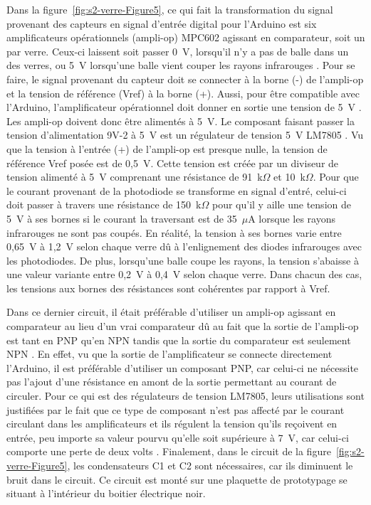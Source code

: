 Dans la figure~\ref{fig:s2-verre-Figure5}, ce qui fait la transformation du signal provenant des capteurs en signal d’entrée digital pour l’Arduino est six amplificateurs opérationnels (ampli-op) MPC602 agissant en comparateur, soit un par verre.
Ceux-ci laissent soit passer 0~V, lorsqu’il n’y a pas de balle dans un des verres, ou 5~V lorsqu’une balle vient couper les rayons infrarouges \cite{microchip_mcp6021/1r/2/3/4_2001}.
Pour se faire, le signal provenant du capteur doit se connecter à la borne (-) de l’ampli-op et la tension de référence (Vref) à la borne (+).
Aussi, pour être compatible avec l’Arduino, l’amplificateur opérationnel doit donner en sortie une tension de 5~V \cite{robotshop_arduino_2010}.
Les ampli-op doivent donc être alimentés à 5~V.
Le composant faisant passer la tension d’alimentation 9V-2 à 5~V est un régulateur de tension 5~V LM7805 \cite{fairchild_lm78xx_2006}.
Vu que la tension à l’entrée (+) de l’ampli-op est presque nulle, la tension de référence Vref posée est de 0,5~V.
Cette tension est créée par un diviseur de tension alimenté à 5~V comprenant une résistance de 91~k$\Omega$ et 10~k$\Omega$.
Pour que le courant provenant de la photodiode se transforme en signal d'entré, celui-ci doit passer à travers une résistance de 150~k$\Omega$ pour qu’il y aille une tension de 5~V à ses bornes si le courant la traversant est de 35~$\mu$A lorsque les rayons infrarouges ne sont pas coupés.
En réalité, la tension à ses bornes varie entre 0,65~V à 1,2~V selon chaque verre dû à l’enlignement des diodes infrarouges avec les photodiodes.
De plus, lorsqu’une balle coupe les rayons, la tension s’abaisse à une valeur variante entre 0,2~V à 0,4~V selon chaque verre.
Dans chacun des cas, les tensions aux bornes des résistances sont cohérentes par rapport à Vref.

Dans ce dernier circuit, il était préférable d’utiliser un ampli-op agissant en comparateur au lieu d’un vrai comparateur dû au fait que la sortie de l’ampli-op est tant en PNP qu'en NPN tandis que la sortie du comparateur est seulement NPN \cite{microchip_mcp6021/1r/2/3/4_2001}.
En effet, vu que la sortie de l’amplificateur se connecte directement l’Arduino, il est préférable d’utiliser un composant PNP, car celui-ci ne nécessite pas l’ajout d’une résistance en amont de la sortie permettant au courant de circuler.
Pour ce qui est des régulateurs de tension LM7805, leurs utilisations sont justifiées par le fait que ce type de composant n’est pas affecté par le courant circulant dans les amplificateurs et ils régulent la tension qu’ils reçoivent en entrée, peu importe sa valeur pourvu qu’elle soit supérieure à 7~V, car celui-ci comporte une perte de deux volts \cite{fairchild_lm78xx_2006}.
Finalement, dans le circuit de la figure~\ref{fig:s2-verre-Figure5}, les condensateurs C1 et C2 sont nécessaires, car ils diminuent le bruit dans le circuit.
Ce circuit est monté sur une plaquette de prototypage se situant à l’intérieur du boitier électrique noir.

